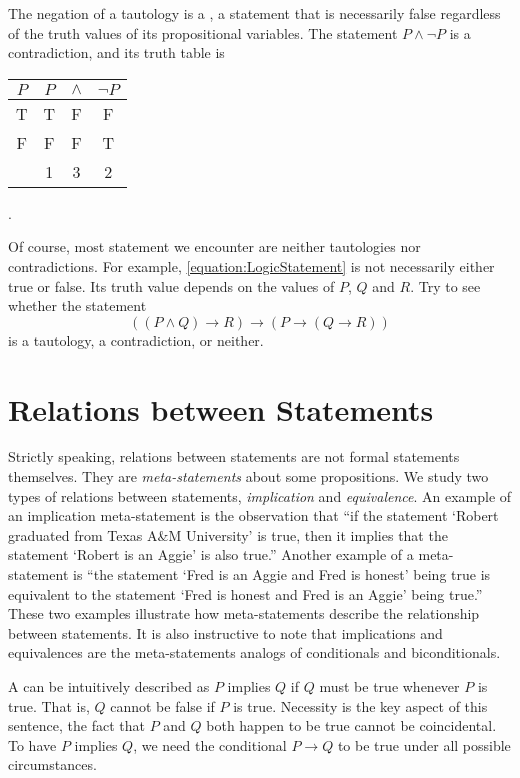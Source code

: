 The negation of a tautology is a , a statement that is necessarily false regardless of the truth values of its propositional variables.
The statement $P \wedge \neg P$ is a contradiction, and its truth table is
\begin{center}
\begin{tabular}{|c|ccc|}
\hline
$P$ & $P$ & $\wedge$ & $\neg P$ \\
\hline
T & T & F & F \\
F & F & F & T \\
& 1 & 3 & 2 \\
\hline
\end{tabular} .
\end{center}

Of course, most statement we encounter are neither tautologies nor contradictions.
For example, \eqref{equation:LogicStatement} is not necessarily either true or false.
Its truth value depends on the values of $P$, $Q$ and $R$.
Try to see whether the statement
\begin{equation*}
((P \wedge Q) \rightarrow R) \rightarrow (P \rightarrow (Q \rightarrow R))
\end{equation*}
is a tautology, a contradiction, or neither.


\section{Relations between Statements}
\label{section:Relations}

Strictly speaking, relations between statements are not formal statements themselves.
They are \emph{meta-statements} about some propositions.
We study two types of relations between statements, \emph{implication} and \emph{equivalence}.
An example of an implication meta-statement is the observation that ``if the statement `Robert graduated from Texas A\&M University' is true, then it implies that the statement `Robert is an Aggie' is also true.''
Another example of a meta-statement is ``the statement `Fred is an Aggie and Fred is honest' being true is equivalent to the statement `Fred is honest and Fred is an Aggie' being true.''
These two examples illustrate how meta-statements describe the relationship between statements.
It is also instructive to note that implications and equivalences are the meta-statements analogs of conditionals and biconditionals.

A  can be intuitively described as $P$ implies $Q$ if $Q$ must be true whenever $P$ is true.
That is, $Q$ cannot be false if $P$ is true.
Necessity is the key aspect of this sentence, the fact that $P$ and $Q$ both happen to be true cannot be coincidental.
To have $P$ implies $Q$, we need the conditional $P \rightarrow Q$ to be true under all possible circumstances.

